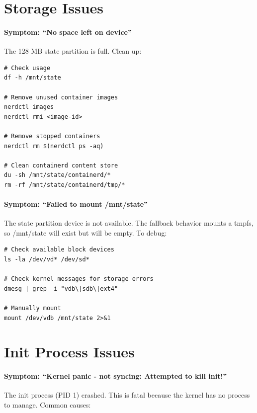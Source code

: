 \section{Storage Issues}

\paragraph{Symptom: ``No space left on device''}

The 128 MB state partition is full. Clean up:

\begin{lstlisting}
# Check usage
df -h /mnt/state

# Remove unused container images
nerdctl images
nerdctl rmi <image-id>

# Remove stopped containers
nerdctl rm $(nerdctl ps -aq)

# Clean containerd content store
du -sh /mnt/state/containerd/*
rm -rf /mnt/state/containerd/tmp/*
\end{lstlisting}

\paragraph{Symptom: ``Failed to mount /mnt/state''}

The state partition device is not available. The fallback behavior
mounts a tmpfs, so /mnt/state will exist but will be empty. To debug:

\begin{lstlisting}
# Check available block devices
ls -la /dev/vd* /dev/sd*

# Check kernel messages for storage errors
dmesg | grep -i "vdb\|sdb\|ext4"

# Manually mount
mount /dev/vdb /mnt/state 2>&1
\end{lstlisting}

\section{Init Process Issues}

\paragraph{Symptom: ``Kernel panic - not syncing: Attempted to kill init!''}

The init process (PID 1) crashed. This is fatal because the kernel
has no process to manage. Common causes:

